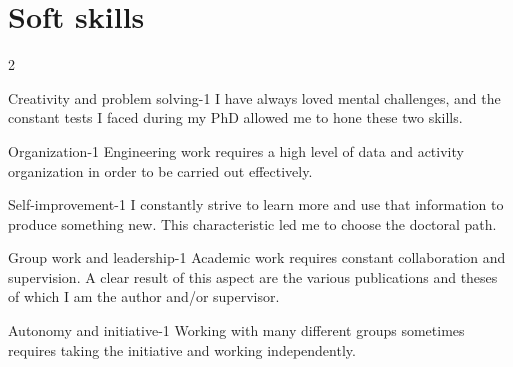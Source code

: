 \section{Soft skills}

\vspace{-\baselineskip}

\begin{multicols}{2}

\skill
    {Creativity and problem solving}{-1}
    {
        I have always loved mental challenges, and the constant tests I faced during my PhD allowed me to hone these two skills.
    }

\skill
    {Organization}{-1}
    {
        Engineering work requires a high level of data and activity organization in order to be carried out effectively.
    }

\skill
    {Self-improvement}{-1}
    {
        I constantly strive to learn more and use that information to produce something new.
        This characteristic led me to choose the doctoral path.
    }

\skill
    {Group work and leadership}{-1}
    {
        Academic work requires constant collaboration and supervision.
        A clear result of this aspect are the various publications and theses of which I am the author and/or supervisor. 
    }

\skill
    {Autonomy and initiative}{-1}
    {
        Working with many different groups sometimes requires taking the initiative and working independently.
    }

\end{multicols}
